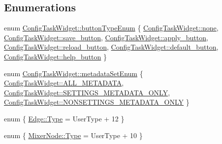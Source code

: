 \subsection*{\-Enumerations}
\begin{DoxyCompactItemize}
\item 
enum \hyperlink{group___u_a_v_object_widget_utils_gacf8aa6ed9da799d1973519df03d1ecfa}{\-Config\-Task\-Widget\-::button\-Type\-Enum} \{ \*
\hyperlink{group___u_a_v_object_widget_utils_ggacf8aa6ed9da799d1973519df03d1ecfaa5ba945be96884ca1ea4e0019425b3fd1}{\-Config\-Task\-Widget\-::none}, 
\hyperlink{group___u_a_v_object_widget_utils_ggacf8aa6ed9da799d1973519df03d1ecfaad57389b40e61729debc6f0e8fd4cbde2}{\-Config\-Task\-Widget\-::save\-\_\-button}, 
\hyperlink{group___u_a_v_object_widget_utils_ggacf8aa6ed9da799d1973519df03d1ecfaaeebf9f5769535bd71cb2907073cf1492}{\-Config\-Task\-Widget\-::apply\-\_\-button}, 
\hyperlink{group___u_a_v_object_widget_utils_ggacf8aa6ed9da799d1973519df03d1ecfaae3d77626c54b30f24b9342696d4155ee}{\-Config\-Task\-Widget\-::reload\-\_\-button}, 
\*
\hyperlink{group___u_a_v_object_widget_utils_ggacf8aa6ed9da799d1973519df03d1ecfaa8a58b5c21f9b09e20e74ab163d47f09a}{\-Config\-Task\-Widget\-::default\-\_\-button}, 
\hyperlink{group___u_a_v_object_widget_utils_ggacf8aa6ed9da799d1973519df03d1ecfaad33ed1c1d7511f14ca49069b8166d04e}{\-Config\-Task\-Widget\-::help\-\_\-button}
 \}
\item 
enum \hyperlink{group___u_a_v_object_widget_utils_gaf06dbd27444c4e9864e702d7c00b0a62}{\-Config\-Task\-Widget\-::metadata\-Set\-Enum} \{ \hyperlink{group___u_a_v_object_widget_utils_ggaf06dbd27444c4e9864e702d7c00b0a62ad6334ea913f7c2a28d32a16d52e1aecf}{\-Config\-Task\-Widget\-::\-A\-L\-L\-\_\-\-M\-E\-T\-A\-D\-A\-T\-A}, 
\hyperlink{group___u_a_v_object_widget_utils_ggaf06dbd27444c4e9864e702d7c00b0a62ac3b6f184c1551bd23d264999d0330302}{\-Config\-Task\-Widget\-::\-S\-E\-T\-T\-I\-N\-G\-S\-\_\-\-M\-E\-T\-A\-D\-A\-T\-A\-\_\-\-O\-N\-L\-Y}, 
\hyperlink{group___u_a_v_object_widget_utils_ggaf06dbd27444c4e9864e702d7c00b0a62a6ac1f4283fd36cd22e96b56756e26bbe}{\-Config\-Task\-Widget\-::\-N\-O\-N\-S\-E\-T\-T\-I\-N\-G\-S\-\_\-\-M\-E\-T\-A\-D\-A\-T\-A\-\_\-\-O\-N\-L\-Y}
 \}
\item 
enum \{ \hyperlink{group___u_a_v_object_widget_utils_ggaa1ed12ae47b3b5c3b75c99c63986575da59a3ef5ffd963601ffda52bb7bf42b3c}{\-Edge\-::\-Type} =  \-User\-Type + 12
 \}
\item 
enum \{ \hyperlink{group___u_a_v_object_widget_utils_ggacfcbe9e0a1b137ea0afeca0789e5e398ae34bb4f715b22e70e0a2182529bed883}{\-Mixer\-Node\-::\-Type} =  \-User\-Type + 10
 \}
\end{DoxyCompactItemize}
